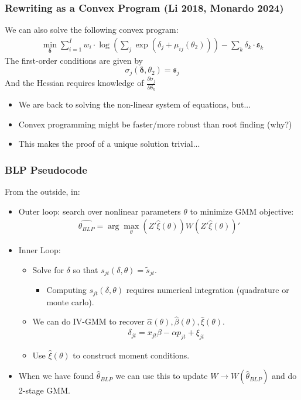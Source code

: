  \begin{frame}
\frametitle{Rewriting as a Convex Program (Li 2018, Monardo 2024)}
We can also solve the following convex program:
\begin{align*}
    \min_{\boldsymbol{\delta}}  \sum_{i=1}^I w_i \cdot \log \left(\sum_{j} \exp\left(\delta_j  + \mu_{ij}(\theta_2) \right) \right) - \sum_k \delta_k \cdot \mathfrak{s}_{k}
\end{align*}
The first-order conditions are given by
$$\sigma_j(\boldsymbol{\delta},\theta_2) = \mathfrak{s}_j$$
And the Hessian requires knowledge of $\frac{\partial \sigma_{j}}{\partial \delta_{k}}$
\begin{itemize}
    \item We are back to solving the non-linear system of equations, but...
    \item Convex programming might be faster/more robust than root finding (why?)
    \item This makes the proof of a unique solution trivial...
  \end{itemize}
 \end{frame}





 \begin{frame}
\frametitle{BLP Pseudocode}
\footnotesize
From the outside, in:
\begin{itemize}
\item Outer loop: search over nonlinear parameters $\theta$ to minimize GMM objective:
 \begin{align*}
 \widehat{\theta_{BLP}} = \arg \max_{\theta} (Z' \hat{\xi}(\theta)) W  (Z' \hat{\xi}(\theta))'
 \end{align*}
 \item Inner Loop:
 \begin{itemize}
\item Solve for $\delta$ so that $s_{jt}(\delta,\theta) = \tilde{s}_{jt}$.
\begin{itemize}
\item Computing $s_{jt}(\delta,\theta)$ requires numerical integration (quadrature or monte carlo).
\end{itemize}
 \item We can do IV-GMM to recover $\hat{\alpha}(\theta),\hat{\beta}(\theta),\hat{\xi}(\theta)$.
  \begin{align*}
\delta_{jt}= x_{jt} \beta -\alpha p_{jt}+  \xi_{jt}
 \end{align*}
  \item Use $\hat{\xi}(\theta)$ to construct moment conditions.
 \end{itemize}
 \item When we have found $\hat{\theta}_{BLP}$ we can use this to update $W \rightarrow W(\hat{\theta}_{BLP})$ and do 2-stage GMM.
 \end{itemize}
\end{frame}




